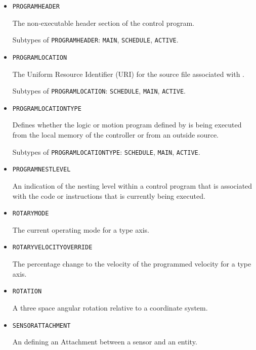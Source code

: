 \begin{itemize}
\item \texttt{PROGRAM\textunderscore HEADER}  

The non-executable header section of the control program.

Subtypes of \texttt{PROGRAM\textunderscore HEADER}: \texttt{MAIN}, \texttt{SCHEDULE}, \texttt{ACTIVE}.

\item \texttt{PROGRAM\textunderscore LOCATION}  

The Uniform Resource Identifier (URI) for the source file associated with .

Subtypes of \texttt{PROGRAM\textunderscore LOCATION}: \texttt{SCHEDULE}, \texttt{MAIN}, \texttt{ACTIVE}.

\item \texttt{PROGRAM\textunderscore LOCATION\textunderscore TYPE}  

Defines whether the logic or motion program defined by  is being executed from the local memory of the controller or from an outside source.

Subtypes of \texttt{PROGRAM\textunderscore LOCATION\textunderscore TYPE}: \texttt{SCHEDULE}, \texttt{MAIN}, \texttt{ACTIVE}.

\item \texttt{PROGRAM\textunderscore NEST\textunderscore LEVEL}  

An indication of the nesting level within a control program that is associated with the code or instructions that is currently being executed.


\item \texttt{ROTARY\textunderscore MODE}  

The current operating mode for a  type axis.


\item \texttt{ROTARY\textunderscore VELOCITY\textunderscore OVERRIDE}  

The percentage change to the velocity of the programmed velocity for a  type axis.


\item \texttt{ROTATION}  

A three space angular rotation relative to a coordinate system.


\item \texttt{SENSOR\textunderscore ATTACHMENT}  

An  defining an \gls{Attachment} between a sensor and an entity.



\end{itemize}
